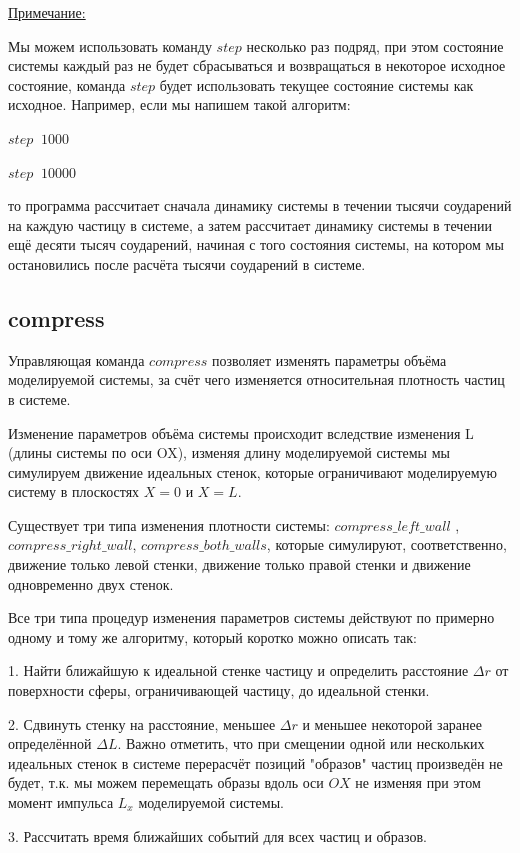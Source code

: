 \documentclass{article}
\begin{document}
\uline{Примечание:}

Мы можем использовать команду $ step $ несколько раз подряд, при этом состояние системы каждый раз не будет сбрасываться и возвращаться в некоторое исходное состояние, команда $ step $ будет использовать текущее состояние системы как исходное. Например, если мы напишем такой алгоритм:

$ step \;\; 1000 $

$ step \;\; 10000 $

то программа рассчитает сначала динамику системы в течении тысячи соударений на каждую частицу в системе, а затем рассчитает динамику системы в течении ещё десяти тысяч соударений, начиная с того состояния системы, на котором мы остановились после расчёта тысячи соударений в системе.

\subsection{compress}
Управляющая команда $ compress $ позволяет изменять параметры объёма моделируемой системы, за счёт чего изменяется относительная плотность частиц в системе. 

Изменение параметров объёма системы происходит вследствие изменения L (длины системы по оси OX), изменяя длину моделируемой системы мы симулируем движение идеальных стенок, которые ограничивают моделируемую систему в плоскостях $ X = 0 $ и $ X = L $.

Существует три типа изменения плотности системы: $ compress\_left\_wall $ , $ compress\_right\_wall $, $ compress\_both\_walls $, которые симулируют, соответственно, движение только левой стенки, движение только правой стенки и движение одновременно двух стенок.

Все три типа процедур изменения параметров системы действуют по примерно одному и тому же алгоритму, который коротко можно описать так:

1. Найти ближайшую к идеальной стенке частицу и определить расстояние $ \Delta r $ от поверхности сферы, ограничивающей частицу, до идеальной стенки.

2. Сдвинуть стенку на расстояние, меньшее $ \Delta r $ и меньшее некоторой заранее определённой $ \Delta L $. Важно отметить, что при смещении одной или нескольких идеальных стенок в системе перерасчёт позиций "образов" частиц произведён не будет, т.к. мы можем перемещать образы вдоль оси $ OX $ не изменяя при этом момент импульса $ L_x $ моделируемой системы.

3. Рассчитать время ближайших событий для всех частиц и образов. 
\end{document}

